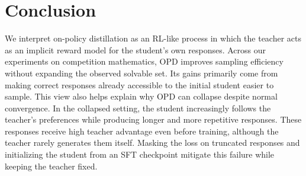 \section{Conclusion}
\label{sec:conclusion}

We interpret on-policy distillation as an RL-like process in which the teacher acts as an implicit reward model for the student's own responses.
Across our experiments on competition mathematics, OPD improves sampling efficiency without expanding the observed solvable set.
Its gains primarily come from making correct responses already accessible to the initial student easier to sample.
This view also helps explain why OPD can collapse despite normal convergence.
In the collapsed setting, the student increasingly follows the teacher's preferences while producing longer and more repetitive responses.
These responses receive high teacher advantage even before training, although the teacher rarely generates them itself.
Masking the loss on truncated responses and initializing the student from an SFT checkpoint mitigate this failure while keeping the teacher fixed.
